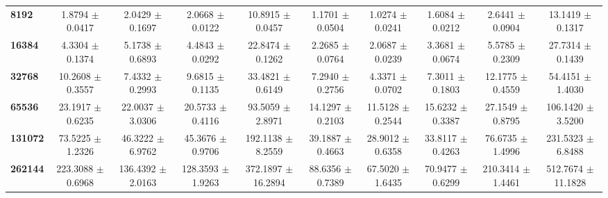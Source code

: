 \begin{tabular}{lccccccccc}
\textbf{8192}  & 1.8794 $\pm$ 0.0417 & 2.0429 $\pm$ 0.1697 & 2.0668 $\pm$ 0.0122 & 10.8915 $\pm$ 0.0457 & 1.1701 $\pm$ 0.0504 & 1.0274 $\pm$ 0.0241 & 1.6084 $\pm$ 0.0212 & 2.6441 $\pm$ 0.0904 & 13.1419 $\pm$ 0.1317\\
\textbf{16384}  & 4.3304 $\pm$ 0.1374 & 5.1738 $\pm$ 0.6893 & 4.4843 $\pm$ 0.0292 & 22.8474 $\pm$ 0.1262 & 2.2685 $\pm$ 0.0764 & 2.0687 $\pm$ 0.0239 & 3.3681 $\pm$ 0.0674 & 5.5785 $\pm$ 0.2309 & 27.7314 $\pm$ 0.1439\\
\textbf{32768}  & 10.2608 $\pm$ 0.3557 & 7.4332 $\pm$ 0.2993 & 9.6815 $\pm$ 0.1135 & 33.4821 $\pm$ 0.6149 & 7.2940 $\pm$ 0.2756 & 4.3371 $\pm$ 0.0702 & 7.3011 $\pm$ 0.1803 & 12.1775 $\pm$ 0.4559 & 54.4151 $\pm$ 1.4030\\
\textbf{65536}  & 23.1917 $\pm$ 0.6235 & 22.0037 $\pm$ 3.0306 & 20.5733 $\pm$ 0.4116 & 93.5059 $\pm$ 2.8971 & 14.1297 $\pm$ 0.2103 & 11.5128 $\pm$ 0.2544 & 15.6232 $\pm$ 0.3387 & 27.1549 $\pm$ 0.8795 & 106.1420 $\pm$ 3.5200\\
\textbf{131072}  & 73.5225 $\pm$ 1.2326 & 46.3222 $\pm$ 6.9762 & 45.3676 $\pm$ 0.9706 & 192.1138 $\pm$ 8.2559 & 39.1887 $\pm$ 0.4663 & 28.9012 $\pm$ 0.6358 & 33.8117 $\pm$ 0.4263 & 76.6735 $\pm$ 1.4996 & 231.5323 $\pm$ 6.8488\\
\textbf{262144} & 223.3088 $\pm$ 0.6968 & 136.4392 $\pm$ 2.0163 & 128.3593 $\pm$ 1.9263 & 372.1897 $\pm$ 16.2894 & 88.6356 $\pm$ 0.7389 & 67.5020 $\pm$ 1.6435 & 70.9477 $\pm$ 0.6299 & 210.3414 $\pm$ 1.4461 & 512.7674 $\pm$ 11.1828\\
\bottomrule
\end{tabular}
